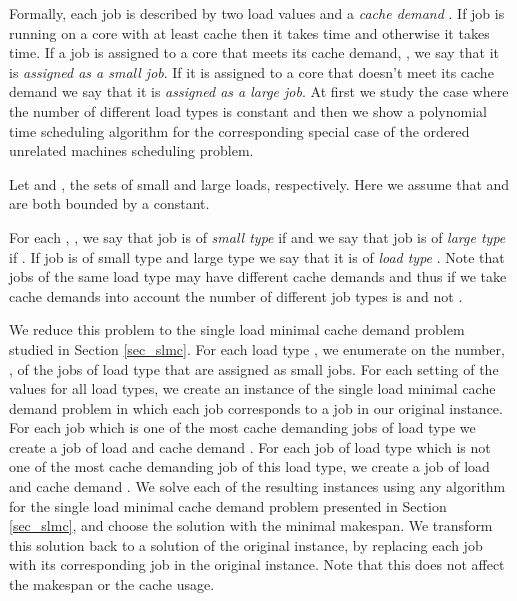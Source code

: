 \documentclass[11pt]{article}
\begin{document}
Formally, each job  is described by two load values  and a \textit{cache demand} . If job  is running on a core with at least  cache then it takes  time and otherwise it takes  time. If a job is assigned to a core that meets its cache demand, , we say that it is \textit{assigned as a small job}. If it is assigned to a core that doesn't meet its cache demand we say that it is \textit{assigned as a large job}.
At first we study the case where the number of different load types is constant and then we show a polynomial time scheduling algorithm for the corresponding special case of the ordered unrelated machines scheduling problem.

Let  and , the sets of small and large loads, respectively.  Here we assume that  and  are both bounded by a constant.

For each , , we say that job  is of \textit{small type } if  and we say that job  is of \textit{large type } if . If job  is of small type  and large type  we say that it is of \textit{load type }. Note that jobs  of the same load type may have different cache demands  and thus if we take cache demands into account the number of different job types is  and not  .

We reduce this problem to the single load minimal cache demand problem studied in Section \ref{sec_slmc}.
For each load type , we enumerate on the number, , of the jobs of load type  that are assigned as small jobs. For each setting of the values  for all load types, we create an instance of the single load minimal cache demand problem in which each job corresponds to a job in our original instance.
For each job  which is one of the  most cache demanding jobs of load type  we create a job of load  and cache demand . For each job  of load type  which is not one of the  most cache demanding job of this load type, we create a job of load  and cache demand .
We solve each of the resulting instances using any algorithm for the single load minimal cache demand problem presented in Section \ref{sec_slmc}, and choose the solution with the minimal makespan. We transform this solution back to a solution of the original instance, by replacing each job with its corresponding job in the original instance. Note that this does not affect the makespan or the cache usage.
\end{document}
